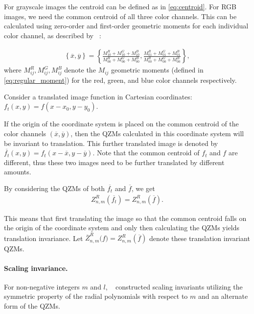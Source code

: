 For grayscale images the centroid can be defined as in \eqref{eq:centroid}. For RGB images, we need the common centroid of all three color channels. This can be calculated using zero-order and first-order geometric moments for each individual color channel, as described by \citeauthor{affine_color}~\cite{affine_color}:

\begin{gather} \label{eq:common_centroid}
    \left\{\overline{x}, \overline{y}\right\} = \left\{\frac{M_{10}^R + M_{10}^G + M_{10}^B}{M_{00}^R + M_{00}^G + M_{00}^B}, \frac{M_{01}^R + M_{01}^G + M_{01}^B}{M_{00}^R + M_{00}^G + M_{00}^B} \right\},
\end{gather}
where $M_{ij}^R, M_{ij}^G, M_{ij}^B$ denote the $M_{ij}$ geometric moments (defined in \eqref{eq:regular_moment}) for the red, green, and blue color channels respectively.


Consider a translated image function in Cartesian coordinates: $f_t(x,y) = f(x - x_0, y - y_0)$. 

If the origin of the coordinate system is placed on the common centroid of the color channels $(\overline{x}, \overline{y})$, then the QZMs calculated in this coordinate system will be invariant to translation. This further translated image is denoted by $\overline{f_t}(x,y) = f_t(x - \overline{x}, y - \overline{y})$. Note that the common centroid of $f_t$ and $f$ are different, thus these two images need to be further translated by different amounts.


By considering the QZMs of both $\overline{f_t}$ and $\overline{f}$, we get
\begin{gather*}
    {Z}_{n,m}^R\left(\overline{f_t}\right) = {Z}_{n,m}^R\left(\overline{f}\right).
\end{gather*}


This means that first translating the image so that the common centroid falls on the origin of the coordinate system and only then calculating the QZMs yields translation invariance. 
Let $\overline{Z}_{n,m}^R\big(f\big) = {Z}_{n,m}^R\left(\overline{f}\right)$ denote these translation invariant QZMs.

\paragraph{Scaling invariance.}
For non-negative integers $m$ and $l$, \citeauthor{qzmi}~\cite{qzmi} constructed scaling invariants utilizing the symmetric property of the radial polynomials with respect to $m$ and an alternate form of the QZMs.



